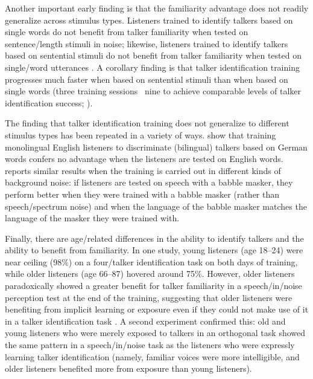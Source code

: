 Another important early finding is that the familiarity advantage does not readily generalize across stimulus types.  Listeners trained to identify talkers based on single words do not benefit from talker familiarity when tested on sentence\-/length stimuli in noise; likewise, listeners trained to identify talkers based on sentential stimuli do not benefit from talker familiarity when tested on single\-/word utterances \citep{NygaardPisoni1998, YonanSommers2000}.  A corollary finding is that talker identification training progresses much faster when based on sentential stimuli than when based on single words (three training sessions \vs\ nine to achieve comparable levels of talker identification success; \citealt{NygaardPisoni1998}).

The finding that talker identification training does not generalize to different stimulus types has been repeated in a variety of ways.  \citet{LeviEtAl2011} show that training monolingual English listeners to discriminate (bilingual) talkers based on German words confers no advantage when the listeners are tested on English words.\footnotemark{}  \citet{VanEngen2012} reports similar results when the training is carried out in different kinds of background noise: if listeners are tested on speech with a babble masker, they perform better when they were trained with a babble masker (rather than speech\-/spectrum noise) and when the language of the babble masker matches the language of the masker they were trained with.



Finally, there are age\-/related differences in the ability to identify talkers and the ability to benefit from familiarity.  In one study, young listeners (age 18–24) were near ceiling (98\%) on a four\-/talker identification task on both days of training, while older listeners (age 66–87) hovered around 75\%.  However, older listeners paradoxically showed a greater benefit for talker familiarity in a speech\-/in\-/noise perception test at the end of the training, suggesting that older listeners were benefiting from implicit learning or exposure even if they could not make use of it in a talker identification task \citep{YonanSommers2000}.  A second experiment confirmed this: old and young listeners who were merely exposed to talkers in an orthogonal task showed the same pattern in a speech\-/in\-/noise task as the listeners who were expressly learning talker identification (namely, familiar voices were more intelligible, and older listeners benefited more from exposure than young listeners).

